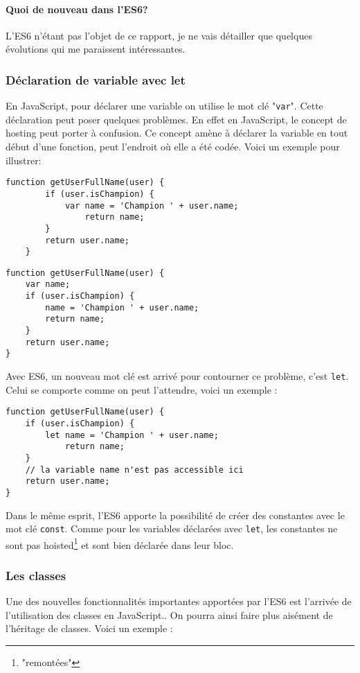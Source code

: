 \paragraph{Quoi de nouveau dans l'ES6?}
L'ES6 n'étant pas l'objet de ce rapport, je ne vais détailler que quelques évolutions qui me paraissent intéressantes.

\subsubsection{Déclaration de variable avec let}
En JavaScript, pour déclarer une variable on utilise le mot clé "\texttt{var}". Cette déclaration peut poser quelques problèmes. En effet en JavaScript, le concept de hosting\cite{ninja:angular} peut porter à confusion. Ce concept amène à déclarer la variable en tout début d'une fonction, peut l'endroit où elle a été codée. Voici un exemple pour illustrer:
\begin{lstlisting}[style=htmlcssjs, caption={Déclaration d'un bloc if}]
	function getUserFullName(user) {
  		if (user.isChampion) {
   			var name = 'Champion ' + user.name;
    			return name;
  		}
  		return user.name;
	}
\end{lstlisting}

\begin{lstlisting}[style=htmlcssjs, caption={Déclaration d'un bloc if equivalent}]
function getUserFullName(user) {
	var name;
  	if (user.isChampion) {
   		name = 'Champion ' + user.name;
    	return name;
  	}
  	return user.name;
}
\end{lstlisting}


Avec ES6, un nouveau mot clé est arrivé pour contourner ce problème, c'est \texttt{let}. Celui se comporte comme on peut l'attendre, voici un exemple : 

\begin{lstlisting}[style=htmlcssjs, caption={Déclaration d'un bloc if avec let}]
function getUserFullName(user) {
  	if (user.isChampion) {
   		let name = 'Champion ' + user.name;
    		return name;
  	}
  	// la variable name n'est pas accessible ici
  	return user.name;
}
\end{lstlisting}
Dans le même esprit, l'ES6 apporte la possibilité de créer des constantes avec le mot clé \texttt{const}. Comme pour les variables déclarées avec \texttt{let}, les constantes ne sont pas hoisted\footnote{"remontées"} et sont bien déclarée dans leur bloc.
\subsubsection{Les classes}
Une des nouvelles fonctionnalités importantes apportées par l'ES6 est l'arrivée de l'utilisation des classes en JavaScript.\label{ts-classes}. On pourra ainsi faire plus aisément de l'héritage de classes. Voici un exemple : 

